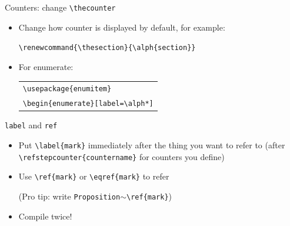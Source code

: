 \documentclass[11pt]{beamer}
\newcommand{\bs}{\textbackslash}
\begin{document}
\begin{frame}{Counters: change \texttt{\bs thecounter}}
  \begin{itemize}
    \item Change how counter is displayed by default, for example:

          \vspace{0.2cm}
          \begin{center}
            \texttt{\bs renewcommand\{\bs thesection\}\{\bs alph\{section\}\}}
          \end{center}

    \vspace{0.3cm}
    \item For enumerate:

          \vspace{0.2cm}
          \begin{center}
            \begin{tabular}{l}
              \texttt{\bs usepackage\{enumitem\}} \\
              \texttt{\bs begin\{enumerate\}[label=\bs alph*]}
            \end{tabular}
          \end{center}
  \end{itemize}
\end{frame}

\begin{frame}{\texttt{label} and \texttt{ref}}
  \begin{itemize}
    \item Put \texttt{\bs label\{mark\}} immediately after the thing you want
          to refer to (after \texttt{\bs refstepcounter\{countername\}} for
          counters you define)

    \vspace{0.3cm}
    \item Use \texttt{\bs ref\{mark\}} or \texttt{\bs eqref\{mark\}} to refer

          (Pro tip: write \texttt{Proposition$\sim$\bs ref\{mark\}})
    \vspace{0.3cm}
    \item Compile twice!
  \end{itemize}
\end{frame}
\end{document}
